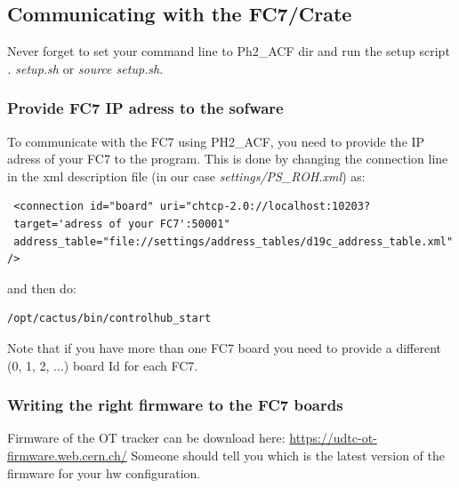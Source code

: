 \documentclass[10pt,a4paper]{article}
\begin{document}
\subsection{Communicating with the FC7/Crate}

Never forget to set your command line to Ph2\_ACF dir and run the setup script \emph{. setup.sh} or \emph{source setup.sh}.

\subsubsection{Provide FC7 IP adress to the sofware}
To communicate with the FC7 using PH2\_ACF, you need to provide the IP adress of your FC7 to the program. This is done by changing the connection line in the xml description file (in our case \emph{settings/PS\_ROH.xml}) as:

\begin{framed}
\begin{verbatim}
 <connection id="board" uri="chtcp-2.0://localhost:10203?
 target='adress of your FC7':50001" 
 address_table="file://settings/address_tables/d19c_address_table.xml" />
\end{verbatim}
\end{framed}

and then do:
\begin{framed}
\begin{verbatim}
/opt/cactus/bin/controlhub_start
\end{verbatim}
\end{framed}

Note that if you have more than one FC7 board you need to provide a different (0, 1, 2, ...) board Id for each FC7.

\subsubsection{Writing the right firmware to the FC7 boards}
Firmware of the OT tracker can be download here: \url{https://udtc-ot-firmware.web.cern.ch/}
Someone should tell you which is the latest version of the firmware for your hw configuration.
\end{document}
